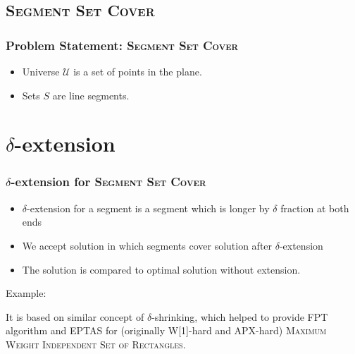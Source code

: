 \documentclass{beamer}
\begin{document}
\subsection{\textsc{Segment Set Cover}}

\begin{frame}
\frametitle{Problem Statement: \textsc{Segment Set Cover}}
\begin{itemize}
\item Universe $\mathcal{U}$ is a set of points in the plane.
\item Sets $S$ are line segments.
\end{itemize}

\begin{center}

\end{center}


\end{frame}

\section{$\delta$-extension}
\begin{frame}
\frametitle{$\delta$-extension for \textsc{Segment Set Cover}}
\begin{itemize}
\item $\delta$-extension for a segment is a segment which is longer by
$\delta$ fraction at both ends
\item We accept solution in which segments cover solution after
$\delta$-extension
\item The solution is compared to optimal solution without extension.
\end{itemize}

Example:



It is based on similar concept of $\delta$-shrinking,
which helped to provide FPT algorithm and EPTAS for 
(originally W[1]-hard and APX-hard)
\textsc{Maximum Weight Independent Set of Rectangles}.
\end{frame}
\end{document}
